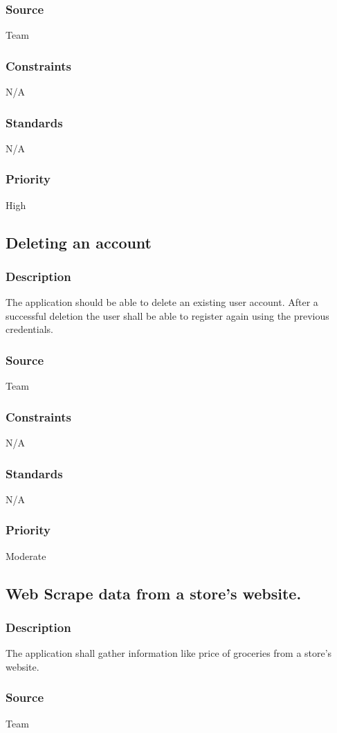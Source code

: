 \subsubsection{Source}
Team
\subsubsection{Constraints}
N/A
\subsubsection{Standards}
N/A
\subsubsection{Priority}
High
\subsection{Deleting an account}
\subsubsection{Description}
The application should be able to delete an existing user account. After a successful deletion the user shall be able to register again using the previous credentials. 
\subsubsection{Source}
Team
\subsubsection{Constraints}
N/A
\subsubsection{Standards}
N/A
\subsubsection{Priority}
Moderate
\subsection{Web Scrape data from a store's website.}
\subsubsection{Description}
The application shall gather information like price of groceries from a store's website.  
\subsubsection{Source}
Team
